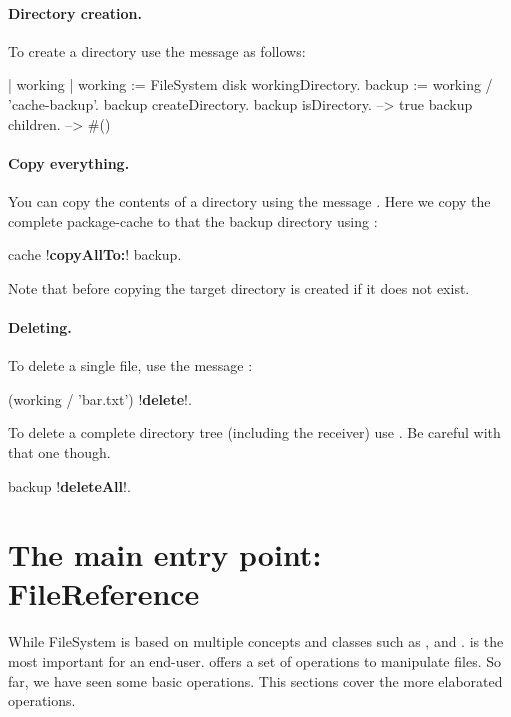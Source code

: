 \documentclass[a4paper,10pt,twoside]{book}
\begin{document}
\paragraph{Directory creation.}
To create a directory use the message  as follows:

\begin{code}{}
| working  |
working := FileSystem disk workingDirectory.
backup := working / 'cache-backup'.
backup createDirectory.
backup isDirectory.
	--> true
backup children.
	--> #()
\end{code} 


\paragraph{Copy everything.}
You can  copy the contents of a directory using the message . Here we copy the complete package-cache to that the backup directory using :

\begin{code}{}
cache !\textbf{copyAllTo:}! backup.
\end{code}

Note that before copying the target directory is created if it does not exist.

\paragraph{Deleting.}

To delete a single file, use the message :
\begin{code}{}
 (working / 'bar.txt') !\textbf{delete}!.
\end{code}

To delete a complete directory tree (including the receiver) use . Be careful with that one though.

\begin{code}{}
backup !\textbf{deleteAll}!.
\end{code}




\section{The main entry point: FileReference}
While FileSystem is based on multiple concepts and classes such as \mbox{,}  and .  is the most important for an end-user.  offers a set of operations to manipulate files. So far, we have seen some basic operations. This sections cover the more elaborated operations.
\end{document}
